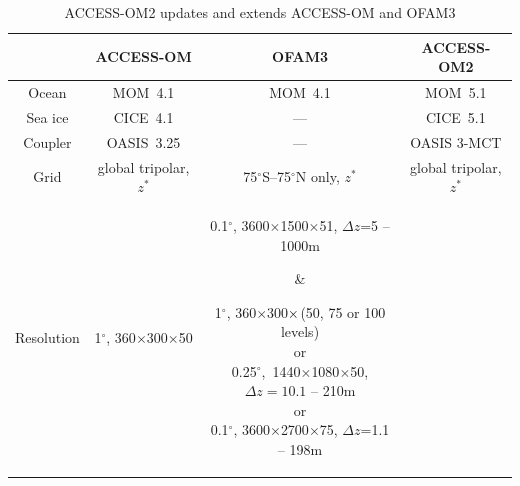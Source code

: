 \documentclass[11pt]{article}
\begin{document}
\begin{table}%
\caption{ACCESS-OM2 updates and extends ACCESS-OM and OFAM3}
\begin{center}
\begin{tabular}{|c|c|c|c|}
\hline
& \textbf{ACCESS-OM} & \textbf{OFAM3} & \textbf{ACCESS-OM2}\\
\hline
Ocean & MOM~4.1 & MOM~4.1 & MOM~5.1\\
Sea ice & CICE~4.1 & --- & CICE~5.1\\
Coupler & OASIS~3.25 & --- & OASIS 3-MCT\\
Grid & global tripolar, $z^*$ & 75$^\circ$S--75$^\circ$N only, $z^*$ & global tripolar, $z^*$\\
Resolution & 
1$^\circ$, 360$\times$300$\times$50 & 
\parbox[][][c]{22ex}{%
0.1$^\circ$, 3600$\times$1500$\times$51, $\Delta z$=5 -- 1000m 
} &
\parbox[][][c]{22ex}{%
1$^\circ$, 360$\times$300$\times\\$(50, 75 or 100 levels)\\
or\\0.25$^\circ$,~1440$\times$1080$\times$50,\\$\Delta z=10.1$ -- 210m\\
or\\0.1$^\circ$, 3600$\times$2700$\times$75, $\Delta z$=1.1 -- 198m\\[-1ex]}\\
\hline
\end{tabular}
\end{center}
\label{T:access-om-ofam3-access-om2}
\end{table}
\end{document}
